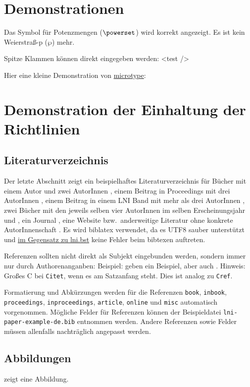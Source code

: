 \documentclass[utf8,biblatex]{lni}
\begin{document}
\section{Demonstrationen}
\label{sec:demos}
Das Symbol für Potenzmengen ($\powerset$) wird korrekt angezeigt.
Es ist kein Weierstraß-p ($\wp$) mehr.

Spitze Klammen können direkt eingegeben werden: <test />

Hier eine kleine Demonstration von \href{https://www.ctan.org/pkg/microtype}{microtype}:
\blindtext

\section{Demonstration der Einhaltung der Richtlinien}
\label{sec:lniconformance}

\subsection{Literaturverzeichnis}
Der letzte Abschnitt zeigt ein beispielhaftes Literaturverzeichnis für Bücher mit einem Autor \cite{Ez10} und zwei AutorInnen \cite{AB00}, einem Beitrag in Proceedings mit drei AutorInnen \cite{ABC01}, einem Beitrag in einem LNI Band mit mehr als drei AutorInnen \cite{Az09}, zwei Bücher mit den jeweils selben vier AutorInnen im selben Erscheinungsjahr \cite{Wa14} und \cite{Wa14b}, ein Journal \cite{Gl06}, eine Website \cite{GI19} bzw.\ anderweitige Literatur ohne konkrete AutorInnenschaft \cite{XX14}.
Es wird biblatex verwendet, da es UTF8 sauber unterstützt und \href{https://github.com/gi-ev/LNI/issues/5}{im Gegensatz zu lni.bst} keine Fehler beim bibtexen auftreten.

Referenzen sollten nicht direkt als Subjekt eingebunden werden, sondern immer nur durch Authorenanganben:
Beispiel:  geben ein Beispiel, aber auch \citet{Az09}.
Hinweis: Großes C bei \texttt{Citet}, wenn es am Satzanfang steht. Dies ist analog zu \texttt{Cref}.

Formatierung und Abkürzungen werden für die Referenzen \texttt{book}, \texttt{inbook}, \texttt{proceedings}, \texttt{inproceedings}, \texttt{article}, \texttt{online} und \texttt{misc} automatisch vorgenommen.
Mögliche Felder für Referenzen können der Beispieldatei \texttt{lni-paper-example-de.bib} entnommen werden.
Andere Referenzen sowie Felder müssen allenfalls nachträglich angepasst werden.

\subsection{Abbildungen}
 zeigt eine Abbildung.
\end{document}
